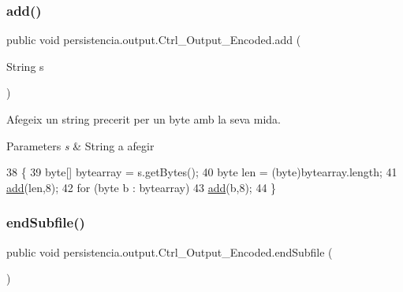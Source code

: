 \subsubsection{\texorpdfstring{add()}{add()}}
{\footnotesize\ttfamily public void persistencia.\+output.\+Ctrl\+\_\+\+Output\+\_\+\+Encoded.\+add (\begin{DoxyParamCaption}\item[{String}]{s }\end{DoxyParamCaption})\hspace{0.3cm}{\ttfamily [inline]}}



Afegeix un string precerit per un byte amb la seva mida. 


\begin{DoxyParams}{Parameters}
{\em s} & String a afegir \\
\hline
\end{DoxyParams}

\begin{DoxyCode}
38                               \{
39         byte[] bytearray = s.getBytes();
40         byte len = (byte)bytearray.length;
41         \hyperlink{classpersistencia_1_1output_1_1Ctrl__Output__Encoded_a840c4e8c37c76677a0c4f5739649291d}{add}(len,8);
42         \textcolor{keywordflow}{for} (byte b : bytearray) 
43            \hyperlink{classpersistencia_1_1output_1_1Ctrl__Output__Encoded_a840c4e8c37c76677a0c4f5739649291d}{add}(b,8);
44     \}
\end{DoxyCode}
\mbox{\label{classpersistencia_1_1output_1_1Ctrl__Output__Encoded_a3864fa867e7533f3d0d82b8f6513dae1}} 
\subsubsection{\texorpdfstring{end\+Subfile()}{endSubfile()}}
{\footnotesize\ttfamily public void persistencia.\+output.\+Ctrl\+\_\+\+Output\+\_\+\+Encoded.\+end\+Subfile (\begin{DoxyParamCaption}{ }\end{DoxyParamCaption})\hspace{0.3cm}{\ttfamily [inline]}}




